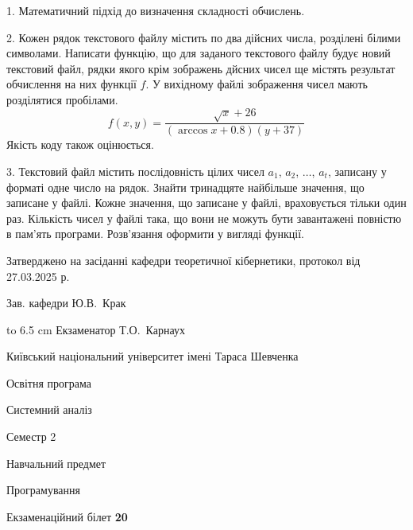 \documentclass[12pt, ukrainian]{article}
\begin{document}
{%
1. Математичний підхід до визначення складності обчислень.%
\par
\vspace{2mm}

2. Кожен рядок текстового файлу містить по два дійсних числа, розділені білими символами.
Написати функцію, що для заданого текстового файлу будує новий текстовий файл, рядки якого крім зображень дйсних чисел ще містять результат обчислення на них функції $f$. У вихідному файлі зображення чисел мають розділятися пробілами. 
$$f(x, y) =\frac{\sqrt x + 26}{(\arccos x + 0.8) (y + 37)}$$ 
Якість коду також оцінюється.

\par
\vspace{2mm}

3. Текстовий файл містить послідовність цілих чисел $a_1$, $a_2$, $\ldots$, $a_t$, записану у форматі одне число на рядок. Знайти тринадцяте найбільше значення, що записане у файлі. Кожне значення, що записане у файлі, враховується тільки один раз. Кількість чисел у файлі така, що вони не можуть бути завантажені повністю в пам'ять програми. Розв'язання оформити у вигляді функції.

}
{\smallskip\smallskip \begin {scriptsize} Затверджено на засіданні кафедри теоретичної кібернетики, протокол   від   27.03.2025 р.\par\smallskip\smallskip\smallskip\smallskip
{\parbox {6.5 cm} {Зав. кафедри \dotfill Ю.В.~Крак}}\hspace {0.7cm} {\hbox to 6.5 cm { Екзаменатор \dotfill Т.О.~Карнаух}} \end{scriptsize}}
\vspace{2.9cm}
{{\begin {scriptsize}\par
{ \center  Київський національний університет імені Тараса Шевченка \par}
{\parbox {5 cm}{Освітня програма \hfill}{\parbox {7 cm}{Системний аналіз\hfill}}\parbox {6 cm}{\hfill Семестр 2}}\par
{\parbox {5 cm} {Навчальний предмет \hfill}\parbox {7 cm}{Програмування \hfill}\parbox {6cm}{\hfill}\par}\vspace{-15pt} \end{scriptsize}}{\center Екзаменаційний білет \No \textbf { 20 }\par}}
\end{document}
